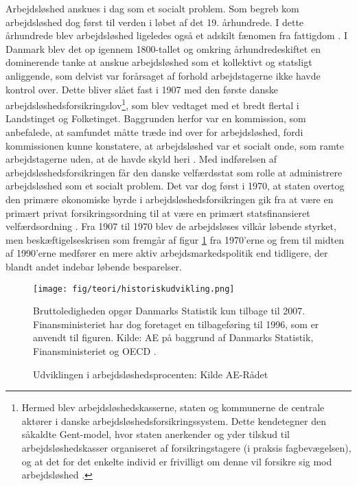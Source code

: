 Arbejdsløshed anskues i dag som et socialt problem. Som begreb kom arbejdsløshed dog først til verden i løbet af det 19. århundrede. I dette århundrede blev arbejdsløshed ligeledes også et adskilt fænomen fra fattigdom \textbf{\parencite[3]{Halvorsen1999}}. I Danmark blev det op igennem 1800-tallet og omkring århundredeskiftet en dominerende tanke at anskue arbejdsløshed som et kollektivt og statsligt anliggende, som delvist var forårsaget af forhold arbejdstagerne ikke havde kontrol over. Dette bliver slået fast i 1907 med den første danske arbejdsløshedsforsikringslov\footnote{Hermed blev arbejdsløshedskasserne, staten og kommunerne de centrale aktører i  danske arbejdsløshedsforsikringssystem. Dette kendetegner den såkaldte Gent-model, hvor staten anerkender og yder tilskud til arbejdsløshedskasser organiseret af forsikringstagere (i praksis fagbevægelsen), og at det for det enkelte individ er frivilligt om denne vil forsikre sig mod arbejdsløshed \parencite{Jensen2007a}.}, som blev vedtaget med et bredt flertal i Landstinget og Folketinget. Baggrunden herfor var en kommission, som anbefalede, at samfundet måtte træde ind over for arbejdsløshed, fordi kommissionen kunne konstatere, at arbejdsløshed var et socialt onde, som ramte arbejdstagerne uden, at de havde skyld heri \parencite[69]{Pedersen2007}. Med indførelsen af arbejdsløshedsforsikringen får den danske velfærdsstat som rolle at administrere arbejdsløshed som et socialt problem. Det var dog først i 1970, at staten overtog den primære økonomiske byrde i arbejdsløshedsforsikringen gik fra at være en primært privat forsikringsordning til at være en primært statsfinansieret velfærdsordning \parencite[83]{Pedersen2007}. Fra 1907 til 1970 blev de arbejdsløses vilkår løbende styrket, men beskæftigelseskrisen som fremgår af figur \ref{fig_udvikl.arbejdsloeshed} fra 1970'erne og frem til midten af 1990'erne medfører en mere aktiv arbejdsmarkedspolitik end tidligere, der blandt andet indebar løbende besparelser. %
% 
\begin{figure}[H]
\begin{centering}
	\caption{Udviklingen i arbejdsløshedsprocenten: Kilde AE-Rådet}
	\texttt{[image: fig/teori/historiskudvikling.png]}

	\footnotesize{Bruttoledigheden opgør Danmarks Statistik kun tilbage til 2007. Finansministeriet har dog foretaget en tilbageføring til 1996, som er anvendt til figuren. Kilde: AE på baggrund af Danmarks Statistik, Finansministeriet og OECD \parencite[2]{Bjoersted2012}.}
	\label{fig_udvikl.arbejdsloeshed}
\end{centering}
\end{figure}

